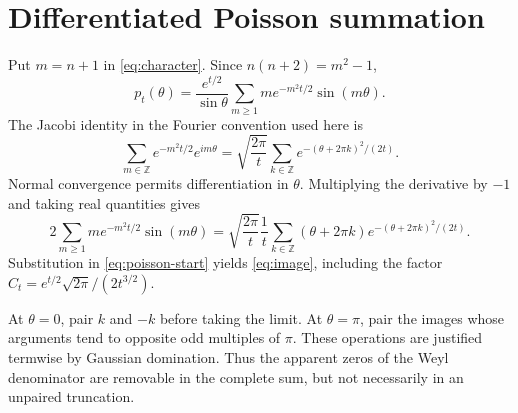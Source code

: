 \section{Differentiated Poisson summation}\label{app:poisson}

Put $m=n+1$ in \eqref{eq:character}.  Since
$n(n+2)=m^2-1$,
\begin{equation}\label{eq:poisson-start}
p_t(\theta)=\frac{e^{t/2}}{\sin\theta}
\sum_{m\ge1}m e^{-m^2t/2}\sin(m\theta).
\end{equation}
The Jacobi identity in the Fourier convention used here is
\[
\sum_{m\in\mathbb Z}e^{-m^2t/2}e^{im\theta}
=\sqrt{\frac{2\pi}{t}}
\sum_{k\in\mathbb Z}e^{-(\theta+2\pi k)^2/(2t)}.
\]
Normal convergence permits differentiation in $\theta$.  Multiplying the
derivative by $-1$ and taking real quantities gives
\[
2\sum_{m\ge1}m e^{-m^2t/2}\sin(m\theta)
=\sqrt{\frac{2\pi}{t}}\frac1t
\sum_{k\in\mathbb Z}(\theta+2\pi k)
e^{-(\theta+2\pi k)^2/(2t)}.
\]
Substitution in \eqref{eq:poisson-start} yields \eqref{eq:image}, including
the factor $C_t=e^{t/2}\sqrt{2\pi}/(2t^{3/2})$.

At $\theta=0$, pair $k$ and $-k$ before taking the limit.  At
$\theta=\pi$, pair the images whose arguments tend to opposite odd multiples
of $\pi$.  These operations are justified termwise by Gaussian domination.
Thus the apparent zeros of the Weyl denominator are removable in the complete
sum, but not necessarily in an unpaired truncation.
